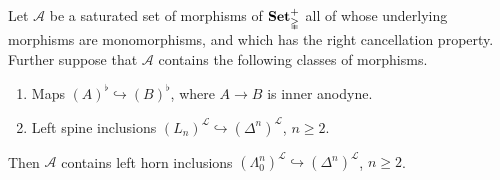 \documentclass[main.tex]{subfiles}
\begin{document}
\begin{lemma}
  \label{lemma:saturated_hull_of_left_spine_inclusions}
  Let $\mathcal{A}$ be a saturated set of morphisms of $\mathbf{Set}_{\mathbb{\Delta}}^{+}$ all of whose underlying morphisms are monomorphisms, and which has the right cancellation property. Further suppose that $\mathcal{A}$ contains the following classes of morphisms.
  \begin{enumerate}
    \item Maps $(A)^{\flat} \hookrightarrow (B)^{\flat}$, where $A \to B$ is inner anodyne.

    \item Left spine inclusions $(L_{n})^{\mathcal{L}} \hookrightarrow (\Delta^{n})^{\mathcal{L}}$, $n \geq 2$.
  \end{enumerate}

  Then $\mathcal{A}$ contains left horn inclusions $(\Lambda^{n}_{0})^{\mathcal{L}} \hookrightarrow (\Delta^{n})^{\mathcal{L}}$, $n \geq 2$.
\end{lemma}
\end{document}
